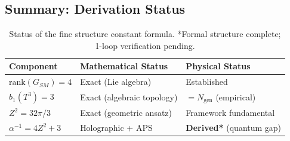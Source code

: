 \documentclass[12pt,a4paper]{article}
\newcommand{\Zsq}{Z^2}
\newcommand{\Ngen}{N_{\text{gen}}}
\begin{document}
\subsection{Summary: Derivation Status}

\begin{table}[H]
\centering
\begin{tabular}{lll}
\toprule
\textbf{Component} & \textbf{Mathematical Status} & \textbf{Physical Status} \\
\midrule
$\text{rank}(G_{SM}) = 4$ & Exact (Lie algebra) & Established \\
$b_1(T^3) = 3$ & Exact (algebraic topology) & $= \Ngen$ (empirical) \\
$\Zsq = 32\pi/3$ & Exact (geometric ansatz) & Framework fundamental \\
$\alpha^{-1} = 4\Zsq + 3$ & Holographic + APS & \textbf{Derived*} (quantum gap) \\
\bottomrule
\end{tabular}
\caption{Status of the fine structure constant formula. *Formal structure complete; 1-loop verification pending.}
\end{table}
\end{document}
